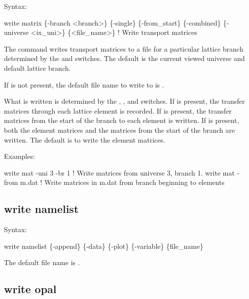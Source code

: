 {{{{{{{{{{{{Syntax:
\begin{example}
    write matrix \{-branch <branch>\} \{-single\} \{-from_start\} \{-combined\}
               \{-universe <ix_uni>\} \{<file_name>\}  ! Write transport matrices
\end{example}

The  command writes transport matrices to a file for a particular lattice branch
determined by the  and  switches. The default is the current viewed
universe and default lattice branch.

If  is not present, the default file name to write to is .

What is written is determined by the , , and 
switches. If  is present, the transfer matrices through each lattice element is recorded.
If  is present, the transfer matrices from the start of the branch to each element
is written. If  is present, both the element matrices and the matrices from the start
of the branch are written. The default is to write the element matrices.

Examples:
\begin{example}
  write mat -uni 3 -br 1  ! Write matrices from universe 3, branch 1.
  write mat -from m.dat   ! Write matrices in m.dat from branch beginning to elements
\end{example}


\subsection{write namelist}
\label{s:write.namelist}

Syntax:
\begin{example}
    write namelist \{-append\} \{-data\} \{-plot\} \{-variable\} \{file_name\}
\end{example}

The default file name is .


\subsection{write opal}
\label{s:write.opal}

}}}}}}}}}}}}
